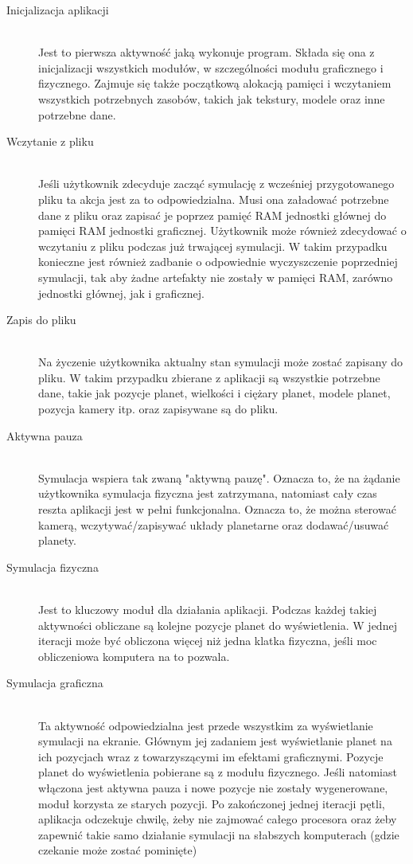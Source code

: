 \begin{description}
	\item[Inicjalizacja aplikacji] \hfill \\
	Jest to pierwsza aktywność jaką wykonuje program. Składa się ona z inicjalizacji wszystkich modułów, w szczególności modułu graficznego i fizycznego. Zajmuje się także początkową alokacją pamięci i wczytaniem wszystkich potrzebnych zasobów, takich jak tekstury, modele oraz inne potrzebne dane.
	\item[Wczytanie z pliku] \hfill \\
	Jeśli użytkownik zdecyduje zacząć symulację z wcześniej przygotowanego pliku ta akcja jest za to odpowiedzialna. Musi ona załadować potrzebne dane z pliku oraz zapisać je poprzez pamięć RAM jednostki głównej do pamięci RAM jednostki graficznej. Użytkownik może również zdecydować o wczytaniu z pliku podczas już trwającej symulacji. W takim przypadku konieczne jest również zadbanie o odpowiednie wyczyszczenie poprzedniej symulacji, tak aby żadne artefakty nie zostały w pamięci RAM, zarówno jednostki głównej, jak i graficznej.
	\item[Zapis do pliku] \hfill \\
	Na życzenie użytkownika aktualny stan symulacji może zostać zapisany do pliku. W takim przypadku zbierane z aplikacji są wszystkie potrzebne dane, takie jak pozycje planet, wielkości i ciężary planet, modele planet, pozycja kamery itp. oraz zapisywane są do pliku.
	\item[Aktywna pauza] \hfill \\
	Symulacja wspiera tak zwaną "aktywną pauzę". Oznacza to, że na żądanie użytkownika symulacja fizyczna jest zatrzymana, natomiast cały czas reszta aplikacji jest w pełni funkcjonalna. Oznacza to, że można sterować kamerą, wczytywać/zapisywać układy planetarne oraz dodawać/usuwać planety.
	\item[Symulacja fizyczna] \hfill \\
	Jest to kluczowy moduł dla działania aplikacji. Podczas każdej takiej aktywności obliczane są kolejne pozycje planet do wyświetlenia. W jednej iteracji może być obliczona więcej niż jedna klatka fizyczna, jeśli moc obliczeniowa komputera na to pozwala.
	\item[Symulacja graficzna] \hfill \\
	Ta aktywność odpowiedzialna jest przede wszystkim za wyświetlanie symulacji na ekranie. Głównym jej zadaniem jest wyświetlanie planet na ich pozycjach wraz z towarzyszącymi im efektami graficznymi. Pozycje planet do wyświetlenia pobierane są z modułu fizycznego. Jeśli natomiast włączona jest aktywna pauza i nowe pozycje nie zostały wygenerowane, moduł korzysta ze starych pozycji. Po zakończonej jednej iteracji pętli, aplikacja odczekuje chwilę, żeby nie zajmować całego procesora oraz żeby zapewnić takie samo działanie symulacji na słabszych komputerach (gdzie czekanie może zostać pominięte)
\end{description}


